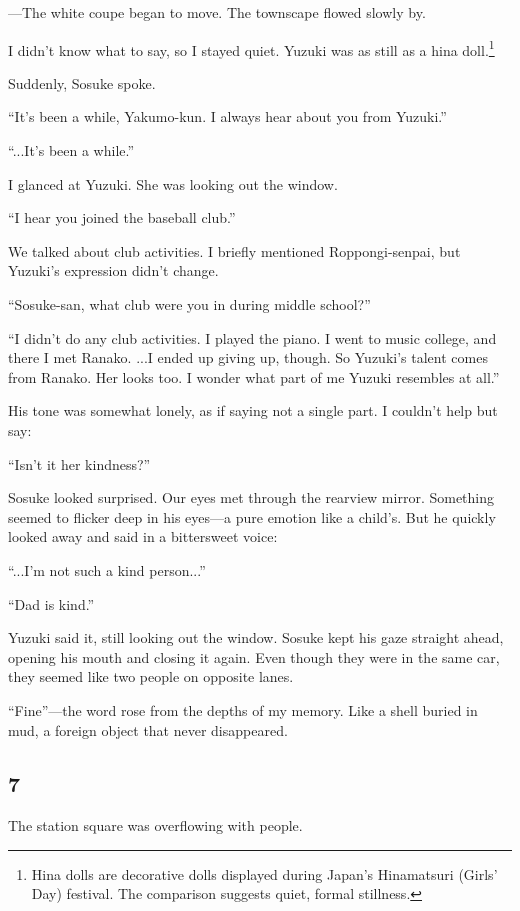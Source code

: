 \documentclass[
    a4paper,
    12pt,
    twoside,
    openany,
    UTF8,
    fontset=windows
]{ctexbook}
\begin{document}
---The white coupe began to move. The townscape flowed slowly by.

I didn't know what to say, so I stayed quiet. Yuzuki was as still as a hina doll.\footnote{Hina dolls are decorative dolls displayed during Japan's Hinamatsuri (Girls' Day) festival. The comparison suggests quiet, formal stillness.}

Suddenly, Sosuke spoke.

``It's been a while, Yakumo-kun. I always hear about you from Yuzuki.''

``...It's been a while.''

I glanced at Yuzuki. She was looking out the window.

``I hear you joined the baseball club.''

We talked about club activities. I briefly mentioned Roppongi-senpai, but Yuzuki's expression didn't change.

``Sosuke-san, what club were you in during middle school?''

``I didn't do any club activities. I played the piano. I went to music college, and there I met Ranako. ...I ended up giving up, though. So Yuzuki's talent comes from Ranako. Her looks too. I wonder what part of me Yuzuki resembles at all.''

His tone was somewhat lonely, as if saying not a single part. I couldn't help but say:

``Isn't it her kindness?''

Sosuke looked surprised. Our eyes met through the rearview mirror. Something seemed to flicker deep in his eyes---a pure emotion like a child's. But he quickly looked away and said in a bittersweet voice:

``...I'm not such a kind person...''

``Dad is kind.''

Yuzuki said it, still looking out the window. Sosuke kept his gaze straight ahead, opening his mouth and closing it again. Even though they were in the same car, they seemed like two people on opposite lanes.

``Fine''---the word rose from the depths of my memory. Like a shell buried in mud, a foreign object that never disappeared.


\subsection*{7}

The station square was overflowing with people.
\end{document}
